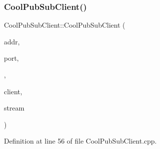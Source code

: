 \subsubsection{\texorpdfstring{Cool\+Pub\+Sub\+Client()}{CoolPubSubClient()}\hspace{0.1cm}{\footnotesize\ttfamily [6/14]}}
{\footnotesize\ttfamily Cool\+Pub\+Sub\+Client\+::\+Cool\+Pub\+Sub\+Client (\begin{DoxyParamCaption}\item[{I\+P\+Address}]{addr,  }\item[{uint16\+\_\+t}]{port,  }\item[{\hyperlink{class_cool_pub_sub_client_a021ec75e9fbaf658370b8005ccfddc14}{M\+Q\+T\+T\+\_\+\+C\+A\+L\+L\+B\+A\+C\+K\+\_\+\+S\+I\+G\+N\+A\+T\+U\+RE}}]{,  }\item[{Client \&}]{client,  }\item[{Stream \&}]{stream }\end{DoxyParamCaption})}



Definition at line 56 of file Cool\+Pub\+Sub\+Client.\+cpp.


